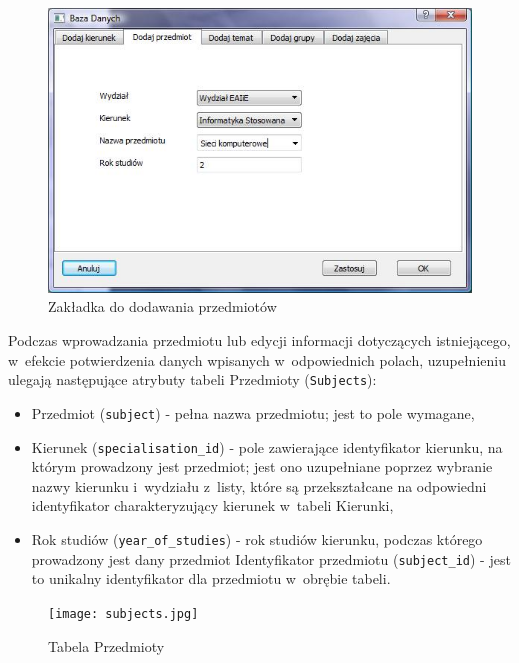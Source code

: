 \begin{figure}
\begin{center}
\includegraphics[scale=0.7]{dodaj_przedmiot.jpg}
\caption{Zakładka do dodawania przedmiotów}
\label{fig:dodajPrzedmiot}
\end{center}
\end{figure}

 Podczas wprowadzania przedmiotu lub edycji informacji dotyczących istniejącego, w~efekcie potwierdzenia danych wpisanych w~odpowiednich polach, uzupełnieniu ulegają następujące atrybuty tabeli Przedmioty (\verb!Subjects!):
\begin{itemize}
\item Przedmiot (\verb!subject!) - pełna nazwa przedmiotu; jest to pole wymagane,
\item Kierunek (\verb!specialisation_id!) - pole zawierające identyfikator kierunku, na którym prowadzony jest przedmiot; jest ono uzupełniane poprzez wybranie nazwy kierunku i~wydziału z~listy, które są przekształcane na odpowiedni identyfikator charakteryzujący kierunek w~tabeli Kierunki,
\item Rok studiów (\verb!year_of_studies!) - rok studiów kierunku, podczas którego prowadzony jest dany przedmiot
Identyfikator przedmiotu (\verb!subject_id!) - jest to unikalny identyfikator dla przedmiotu w~obrębie tabeli.
\end{itemize}

\begin{figure}
\begin{center}
\texttt{[image: subjects.jpg]}
\caption{Tabela Przedmioty}
\label{fig:subjects}
\end{center}
\end{figure}

